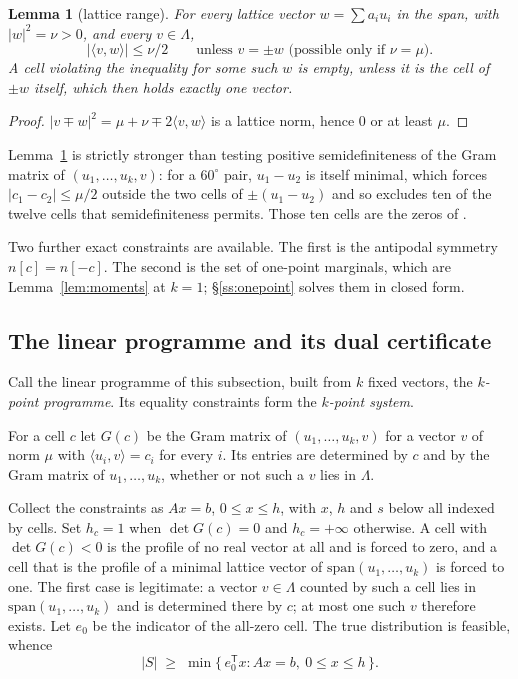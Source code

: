 \documentclass[11pt]{amsart}
\newtheorem{lemma}[theorem]{Lemma}
\theoremstyle{remark}
\newcommand{\ip}[2]{\langle #1,#2\rangle}
\begin{document}
\begin{lemma}[lattice range]\label{lem:range}
For every lattice vector $w=\sum a_iu_i$ in the span, with $|w|^2=\nu>0$, and
every $v\in\Lambda$,
\[
  |\ip{v}{w}|\le \nu/2 \qquad\text{unless } v=\pm w \text{ (possible only if }\nu=\mu).
\]
A cell violating the inequality for some such $w$ is empty, unless it is the
cell of $\pm w$ itself, which then holds exactly one vector.
\end{lemma}

\begin{proof}
$|v\mp w|^2=\mu+\nu\mp2\ip{v}{w}$ is a lattice norm, hence $0$ or at least
$\mu$.
\end{proof}

Lemma~\ref{lem:range} is strictly stronger than testing positive
semidefiniteness of the Gram matrix of $(u_1,\dots,u_k,v)$: for a $60^\circ$
pair, $u_1-u_2$ is itself minimal, which forces $|c_1-c_2|\le\mu/2$ outside the two
cells of $\pm(u_1-u_2)$ and so excludes ten of the twelve cells that
semidefiniteness permits. Those ten cells are the zeros of
\cite[Lemma 4.2]{ozeki2016}.

Two further exact constraints are available. The first is the antipodal
symmetry $n[c]=n[-c]$. The second is the set of one-point marginals, which are
Lemma~\ref{lem:moments} at $k=1$; \S\ref{ss:onepoint} solves them in closed form.

\subsection{The linear programme and its dual certificate}\label{ss:cert}

Call the linear programme of this subsection, built from $k$ fixed vectors, the
\emph{$k$-point programme}. Its equality constraints form the \emph{$k$-point
system}.

For a cell $c$ let $G(c)$ be the Gram matrix of $(u_1,\dots,u_k,v)$ for a vector
$v$ of norm $\mu$ with $\ip{u_i}{v}=c_i$ for every $i$. Its entries are
determined by $c$ and by the Gram matrix of $u_1,\dots,u_k$, whether or not such
a $v$ lies in $\Lambda$.

Collect the constraints as $Ax=b$, $0\le x\le h$, with $x$, $h$ and $s$ below all
indexed by cells. Set $h_c=1$ when $\det G(c)=0$ and $h_c=+\infty$ otherwise. A cell with
$\det G(c)<0$ is the profile of no real vector at all and is forced to zero, and a
cell that is the profile of a minimal lattice vector of
$\mathrm{span}(u_1,\dots,u_k)$ is forced to one.
The first case is legitimate: a vector $v\in\Lambda$ counted by such a cell lies
in $\mathrm{span}(u_1,\dots,u_k)$ and is determined there by $c$; at most one
such $v$ therefore exists. Let $e_0$ be the indicator of the all-zero cell. The
true distribution is feasible, whence
\[
  |S| \;\ge\; \min\{\, e_0^{\mathsf T}x : Ax=b,\ 0\le x\le h \,\}.
\]
\end{document}
